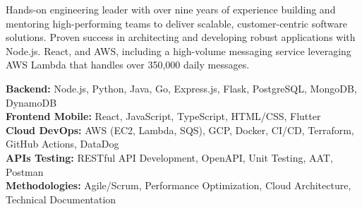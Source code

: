 \documentclass[9pt]{developercv} %
\begin{document}
	\begin{minipage}[t]{0.4\textwidth} %
		\vspace{-\baselineskip} %
		Hands-on engineering leader with over nine years of experience building and mentoring high-performing teams to deliver scalable, customer-centric software solutions. Proven success in architecting and developing robust applications with Node.js. React, and AWS, including a high-volume messaging service leveraging AWS Lambda that handles over 350,000 daily messages.
	\end{minipage}
	\hfill
	\begin{minipage}[t]{0.5\textwidth} %
			\vspace{-\baselineskip} %
			\vspace{-\baselineskip} %
			\vspace{-\baselineskip} %
			\vspace{-\baselineskip}
		
		\textbf{Backend:} Node.js, Python, Java, Go, Express.js, Flask, PostgreSQL, MongoDB, DynamoDB \\
		
		\textbf{Frontend Mobile:} React, JavaScript, TypeScript, HTML/CSS, Flutter \\
		
		\textbf{Cloud DevOps:} AWS (EC2, Lambda, SQS), GCP, Docker, CI/CD, Terraform, GitHub Actions, DataDog \\
		
		\textbf{APIs Testing:} RESTful API Development, OpenAPI, Unit Testing, AAT, Postman \\
		
		\textbf{Methodologies:} Agile/Scrum, Performance Optimization, Cloud Architecture, Technical Documentation \\
		
	\end{minipage}

	\vspace{0.5cm}

\end{document}
